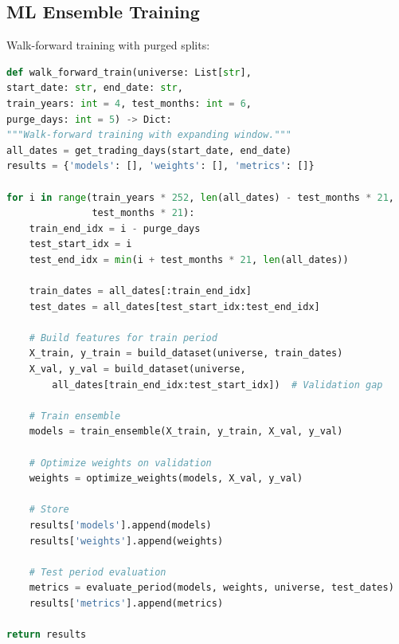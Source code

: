 \documentclass[12pt,a4paper]{report}
\begin{document}
\subsection{ML Ensemble Training}
Walk-forward training with purged splits:
\begin{lstlisting}[language=Python, caption=Walk-Forward Training Loop]
def walk_forward_train(universe: List[str],
start_date: str, end_date: str,
train_years: int = 4, test_months: int = 6,
purge_days: int = 5) -> Dict:
"""Walk-forward training with expanding window."""
all_dates = get_trading_days(start_date, end_date)
results = {'models': [], 'weights': [], 'metrics': []}

for i in range(train_years * 252, len(all_dates) - test_months * 21, 
               test_months * 21):
    train_end_idx = i - purge_days
    test_start_idx = i
    test_end_idx = min(i + test_months * 21, len(all_dates))

    train_dates = all_dates[:train_end_idx]
    test_dates = all_dates[test_start_idx:test_end_idx]

    # Build features for train period
    X_train, y_train = build_dataset(universe, train_dates)
    X_val, y_val = build_dataset(universe, 
        all_dates[train_end_idx:test_start_idx])  # Validation gap

    # Train ensemble
    models = train_ensemble(X_train, y_train, X_val, y_val)

    # Optimize weights on validation
    weights = optimize_weights(models, X_val, y_val)

    # Store
    results['models'].append(models)
    results['weights'].append(weights)

    # Test period evaluation
    metrics = evaluate_period(models, weights, universe, test_dates)
    results['metrics'].append(metrics)

return results
\end{lstlisting}
\end{document}
